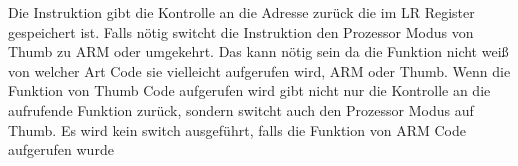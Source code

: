 
Die  Instruktion gibt die Kontrolle an die Adresse zurück die im \ac{LR} Register gespeichert ist.
Falls nötig switcht die Instruktion den Prozessor Modus von Thumb zu ARM oder umgekehrt.
Das kann nötig sein da die \ttf Funktion nicht weiß von welcher Art Code sie vielleicht aufgerufen wird,
ARM oder Thumb.
Wenn die Funktion von Thumb Code aufgerufen wird gibt  nicht nur 
die Kontrolle an die aufrufende Funktion zurück, sondern switcht auch den Prozessor Modus auf 
Thumb. Es wird kein switch ausgeführt, falls die Funktion von ARM Code aufgerufen wurde  
